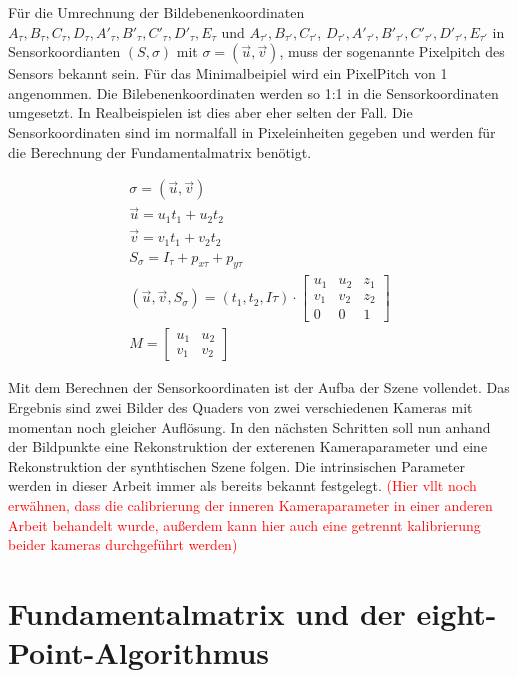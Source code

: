 Für die Umrechnung der Bildebenenkoordinaten $A_\tau,B_\tau,C_\tau,D_\tau,A'_\tau,B'_\tau,C'_\tau,D'_\tau, E_\tau$ und $A_{\tau'},B_{\tau'},C_{\tau'}$, $D_{\tau'},A'_{\tau'},B'_{\tau'},C'_{\tau'},D'_{\tau'}, E_{\tau'}$ in Sensorkoordianten $(S,\sigma)$ mit $\sigma = (\vec{u},\vec{v})$, muss der sogenannte Pixelpitch des Sensors bekannt sein. Für das Minimalbeipiel wird ein PixelPitch von 1 angenommen. Die Bilebenenkoordinaten werden so 1:1 in die Sensorkoordinaten umgesetzt. In Realbeispielen ist dies aber eher selten der Fall. Die Sensorkoordinaten sind im normalfall in Pixeleinheiten gegeben und werden für die Berechnung der Fundamentalmatrix benötigt.

\begin{gather}
\sigma = (\vec{u},\vec{v})\\	
\vec{u} = u_1t_1+u_2t_2\\
\vec{v} = v_1t_1+v_2t_2\\
S_\sigma = I_\tau +p_{x\tau}+p_{y\tau}\\
(\vec{u},\vec{v}, S_\sigma)=(t_1,t_2,I\tau)\cdot
\begin{bmatrix}
u_1&u_2&z_1\\
v_1&v_2&z_2\\
0&0&1
\end{bmatrix}	\\
M = 	
\begin{bmatrix}
u_1&u_2\\
v_1&v_2
\end{bmatrix}
\end{gather}

Mit dem Berechnen der Sensorkoordinaten ist der Aufba der Szene vollendet. Das Ergebnis sind zwei Bilder des Quaders von zwei verschiedenen Kameras mit momentan noch gleicher Auflösung. In den nächsten Schritten soll nun anhand der Bildpunkte eine Rekonstruktion der exterenen Kameraparameter und eine Rekonstruktion der synthtischen Szene folgen. Die intrinsischen Parameter werden in dieser Arbeit immer als bereits bekannt festgelegt. \textcolor{red}{(Hier vllt noch erwähnen, dass die calibrierung der inneren Kameraparameter in einer anderen Arbeit behandelt wurde, außerdem kann hier auch eine getrennt kalibrierung beider kameras durchgeführt werden) }

\section{Fundamentalmatrix und der eight-Point-Algorithmus}
\label{sec:MinimalFun}




